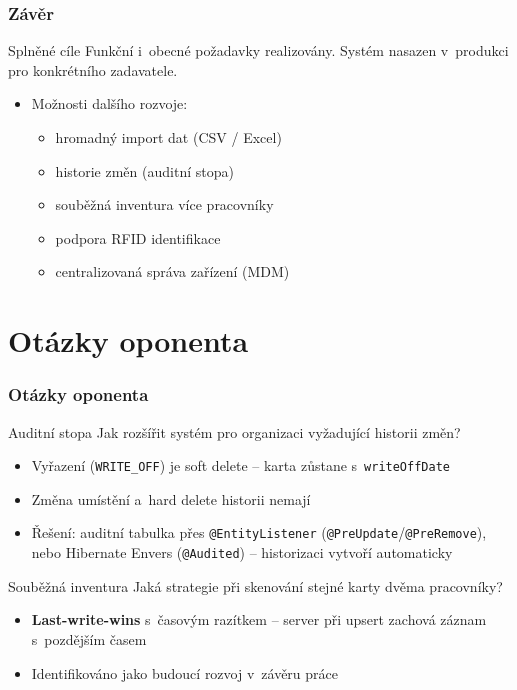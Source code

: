 \documentclass[czech,blue]{ctufit-presentation}
\begin{document}
\begin{frame}
	\frametitle{Závěr}
	\begin{exampleblock}{Splněné cíle}
		Funkční i~obecné požadavky realizovány.
		Systém nasazen v~produkci pro konkrétního zadavatele.
	\end{exampleblock}
	\begin{itemize}
		\item Možnosti dalšího rozvoje:
		\begin{itemize}
			\item hromadný import dat (CSV / Excel)
			\item historie změn (auditní stopa)
			\item souběžná inventura více pracovníky
			\item podpora RFID identifikace
			\item centralizovaná správa zařízení (MDM)
		\end{itemize}
	\end{itemize}
\end{frame}

\begin{plainFrame}[colourbg]
\end{plainFrame}

\section{Otázky oponenta}

\begin{frame}
	\frametitle{Otázky oponenta}
	\begin{block}{Auditní stopa}
		Jak rozšířit systém pro organizaci vyžadující historii změn?
	\end{block}
	\begin{itemize}
		\item Vyřazení (\texttt{WRITE\_OFF}) je soft delete – karta zůstane s~\texttt{writeOffDate}
		\item Změna umístění a~hard delete historii nemají
		\item Řešení: auditní tabulka přes \texttt{@EntityListener} (\texttt{@PreUpdate}/\texttt{@PreRemove}),\\nebo Hibernate Envers (\texttt{@Audited}) – historizaci vytvoří automaticky
	\end{itemize}
	\vspace{0.5em}
	\begin{block}{Souběžná inventura}
		Jaká strategie při skenování stejné karty dvěma pracovníky?
	\end{block}
	\begin{itemize}
		\item \textbf{Last-write-wins} s~časovým razítkem – server při upsert zachová záznam s~pozdějším časem
		\item Identifikováno jako budoucí rozvoj v~závěru práce
	\end{itemize}
\end{frame}
\end{document}
